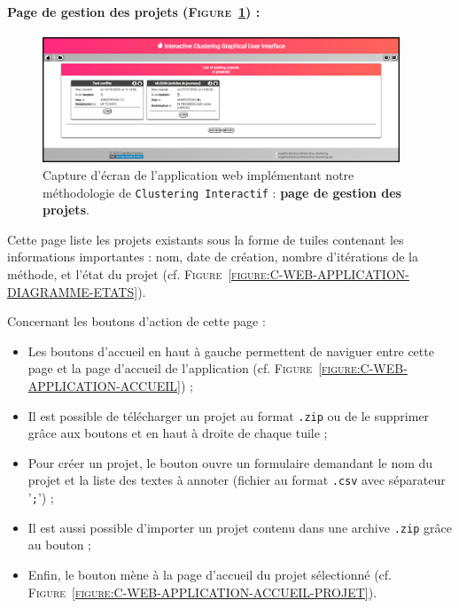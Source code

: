 	
	\newpage
	\paragraph{Page de gestion des projets (\textsc{Figure~\ref{figure:C-WEB-APPLICATION-LISTE-PROJETS}}) :}
		
		\begin{figure}[H]
			\centering
			\includegraphics[width=0.95\textwidth]{figures/interactive-clustering-application-liste-projets}
			\caption{
				Capture d'écran de l'application web implémentant notre méthodologie de \texttt{Clustering Interactif} : \textbf{page de gestion des projets}.
			}
			\label{figure:C-WEB-APPLICATION-LISTE-PROJETS}
		\end{figure}
		
		Cette page liste les projets existants sous la forme de tuiles contenant les informations importantes : nom, date de création, nombre d'itérations de la méthode, et l'état du projet (cf. \textsc{Figure~\ref{figure:C-WEB-APPLICATION-DIAGRAMME-ETATS}}).
		
		Concernant les boutons d'action de cette page :
		\begin{itemize}
			\item Les boutons d'accueil en haut à gauche permettent de naviguer entre cette page et la page d'accueil de l'application (cf. \textsc{Figure~\ref{figure:C-WEB-APPLICATION-ACCUEIL}}) ;
			\item Il est possible de télécharger un projet au format \texttt{.zip} ou de le supprimer grâce aux boutons \textguillemets{\faDownload} et \textguillemets{\faTrash} en haut à droite de chaque tuile ;
			\item Pour créer un projet, le bouton  ouvre un formulaire demandant le nom du projet et la liste des textes à annoter (fichier au format \texttt{.csv} avec séparateur '\texttt{;}') ;
			\item Il est aussi possible d'importer un projet contenu dans une archive \texttt{.zip} grâce au bouton  ;
			\item Enfin, le bouton  mène à la page d'accueil du projet sélectionné (cf. \textsc{Figure~\ref{figure:C-WEB-APPLICATION-ACCUEIL-PROJET}}).
		\end{itemize}
	
